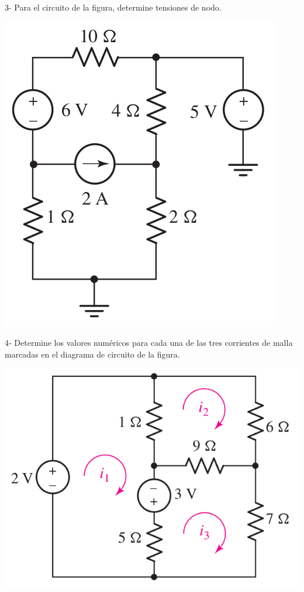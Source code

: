\documentclass[10pt,letterpaper]{article}
\begin{document}
  	3- Para el circuito de la figura, determine tensiones de nodo.
  	
	\includegraphics[scale=0.3]{c3}
	
	4- Determine los valores numéricos para cada una de las tres corrientes de malla marcadas en el diagrama de circuito de la figura.
	
		\includegraphics[scale=0.38]{c4}
	
\end{document}
